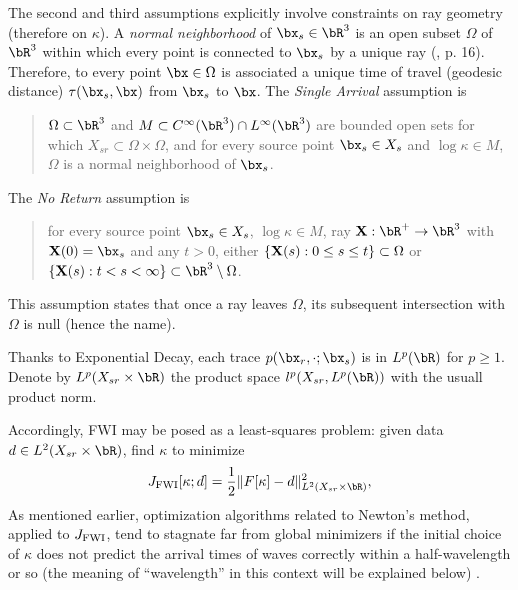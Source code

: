 The second and third assumptions explicitly involve constraints on ray geometry
(therefore on $\kappa$). A {\em normal neighborhood} of
$\bx_s \in \bR^3$ is an open subset $\Omega$ of $\bR^3$ 
within which every point is connected to $\bx_s$ by  a unique ray  (\cite{Friedlander:75},
p. 16). Therefore, to every point $\bx \in \Omega$ is associated a
unique time of travel (geodesic distance) $\tau(\bx_s,\bx)$ from $\bx_s$ to $\bx$.
The {\em Single Arrival} assumption is
\begin{quote}
  $\Omega\subset \bR^3$ and $M \subset C^{\infty}(\bR^3) \cap
  L^{\infty}(\bR^3)$ are bounded open sets for which $X_{sr} \subset
  \Omega \times \Omega$, and for every source point $\bx_s\in X_{s}$
  and $\log \kappa \in M$, $\Omega$ is a normal neighborhood of
  $\bx_s$.
\end{quote}

The {\em No Return} assumption is
\begin{quote}
  for every source point $\bx_s \in X_{s}$, $\log \kappa \in M$, ray ${\bf X}:\bR^+\rightarrow \bR^3$
  with ${\bf X}(0)=\bx_s$ and any $t>0$, either $\{{\bf X}(s): 0\le s \le t\} \subset \Omega$
  or $\{{\bf X}(s): t < s < \infty\} \subset \bR^3 \setminus \Omega$.
\end{quote}
This assumption states that once a ray leaves
$\Omega$, its subsequent intersection with $\Omega$ is null (hence the name).

Thanks to Exponential Decay, each trace $p(\bx_r,\cdot;\bx_s)$ is in $L^{p}(\bR)$ for $p
\ge 1$.
Denote by $L^p(X_{sr} \times \bR)$ the product space $l^p(X_{sr},L^p(\bR))$
with the usuall product norm. 

Accordingly, FWI may be posed as a least-squares
problem: given data $d \in
L^2(X_{sr}\times \bR)$, find $\kappa$ to minimize
\begin{equation}
  \label{eqn:fwi}
  J_{\rm FWI}[\kappa;d]= \frac{1}{2}\|F[\kappa]-d\|^2_{L^2(X_{sr} \times \bR)},
\end{equation}
As mentioned earlier, optimization algorithms related to Newton's method, applied to
$J_{\rm FWI}$, tend to stagnate far from global minimizers if
the initial choice of $\kappa$ does not predict the arrival times of
waves correctly within a half-wavelength or so (the meaning of
``wavelength'' in this context will be explained below)
\cite[]{GauTarVir:86,VirieuxOperto:09}.

